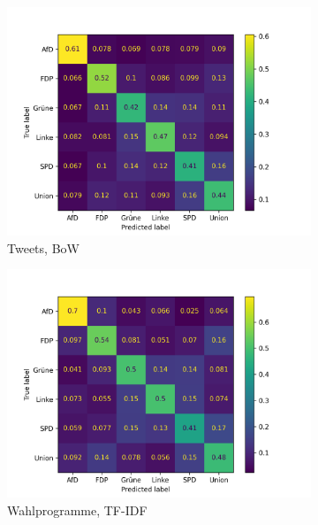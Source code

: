 \begin{figure}[H]
  \centering
  \begin{subfigure}{0.49\textwidth}
    \includegraphics[width=\textwidth]{data/images/modeling/mlp/under/tweets_confusion_matrix.png}
    \caption{Tweets, \ac{BoW}}
    \label{sfig:confusionMatrixMlpTweets}
  \end{subfigure}
  \hfill
  \begin{subfigure}{0.49\textwidth}
    \includegraphics[width=\textwidth]{data/images/modeling/mlp/under/party_programs_confusion_matrix.png}
    \caption{Wahlprogramme, \ac{TF-IDF}}
    \label{sfig:confusionMatrixMlpManifest}
  \end{subfigure}
  \hfill
  \begin{subfigure}{0.49\textwidth}

\end{subfigure}
\end{figure}
